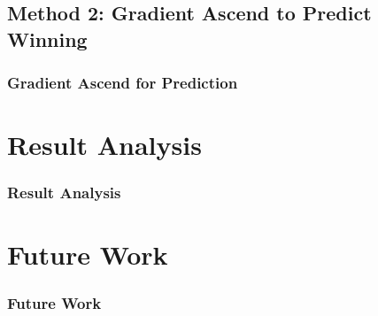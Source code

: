 \documentclass{beamer}
\begin{document}
\subsection{Method 2: Gradient Ascend to Predict Winning}
\begin{frame}
  \frametitle{Gradient Ascend for Prediction}
\end{frame}
% 
% 
% 
% 
% 
% 
% 
% 
\section{Result Analysis}
\begin{frame}
  \frametitle{Result Analysis}
\end{frame}
% 
% 
% 
% 
% 
% 
% 
% 
% 
% 
% 
% 
% 
% 
% 
% 
\section{Future Work}
\begin{frame}
  \frametitle{Future Work}
\end{frame}
% 
% 
% 
% 
% 
% 
% 
% 
% 
% 
% 
% 
% 
% 
% 
% 
\end{document}
